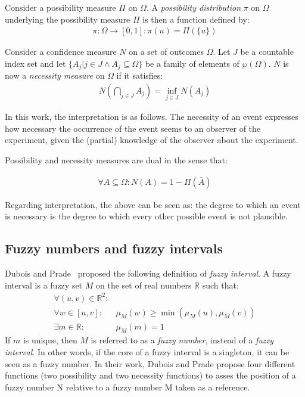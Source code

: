 \begin{definition}
Consider a possibility measure $\Pi$ on $\Omega$. A \emph{possibility distribution} $\pi$ on $\Omega$ underlying the possibility measure $\Pi$ is then a function defined by:
	\begin{align}
	\pi : \Omega \rightarrow \left[0, 1\right] : \pi(u) = \Pi(\{u\})
	\end{align}
\end{definition}

\begin{definition}
Consider a confidence measure $N$ on a set of outcomes $\Omega$. Let $J$ be a countable index set and let $\{ A_{j} | j \in J \wedge A_{j} \subseteq \Omega \}$ be a family of elements of $\wp(\Omega)$. $N$ is now a \emph{necessity measure} on $\Omega$ if it satisfies:
	\begin{align}
	N\left(\bigcap_{j \in J} A_{j} \right) = \inf_{j \in J} N(A_{j})
	\end{align}
\end{definition}

In this work, the interpretation is as follows. The necessity of an event expresses how necessary the occurrence of the event seems to an observer of the experiment, given the (partial) knowledge of the observer about the experiment.

Possibility and necessity measures are dual in the sense that:

\begin{align}
\forall A \subseteq \Omega : N(A) = 1 - \Pi(\bar{A})
\end{align}

Regarding interpretation, the above can be seen as: the degree to which an event is necessary is the degree to which every other possible event is not plausible.

\subsection*{\label{subsec:fuzzy-numbers}Fuzzy numbers and fuzzy intervals}
Dubois and Prade~\cite{Dubois1983} proposed the following definition of \emph{fuzzy interval}.
A fuzzy interval is a fuzzy set $M$ on the set of real numbers $\mathbb{R}$ such that:
\begin{eqnarray}
\forall (u,v)\in\mathbb{R}^2:&\\
\nonumber
\forall w \in [u,v]:&\mu_M(w) \geq\min(\mu_M(u),\mu_M(v))  \\
\exists m \in \mathbb{R}:& \mu_M(m)=1 
\end{eqnarray}
If $m$ is unique, then $M$ is referred to as a \emph{fuzzy number}, instead of a \emph{fuzzy interval}. In other words, if the core of a fuzzy interval is a singleton, it can be seen as a fuzzy number. In their work, Dubois and Prade propose four different functions (two possibility and two necessity functions) to asses the position of a fuzzy number N relative to  a fuzzy number M taken as a reference.

